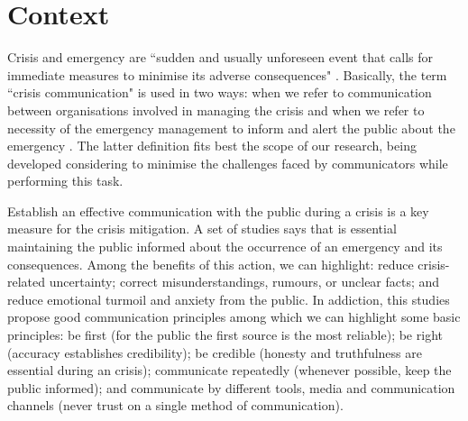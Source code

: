 \section{Context} 
%

Crisis and emergency are ``sudden and usually unforeseen event that calls for immediate measures to minimise its adverse consequences" \cite{dha1992internationally}. Basically, the term ``crisis communication" is used in two ways: when we refer to communication between organisations involved in managing the crisis and when we refer to necessity of the emergency management to inform and alert the public about the emergency \cite{cdc2014}. The latter definition fits best the scope of our research, being developed considering to minimise the challenges faced by communicators while performing this task. 

Establish an effective communication with the public during a crisis is a key measure for the crisis mitigation. A set of studies \cite{tinker2010}\cite{cdc2014}\cite{glik2007}\cite{seeger2006best} says that is essential maintaining the public informed about the occurrence of an emergency and its consequences. Among the benefits of this action, we can highlight: reduce crisis-related uncertainty; correct misunderstandings, rumours, or unclear facts; and reduce emotional turmoil and anxiety from the public. In addiction, this studies propose good communication principles among which we can highlight some basic principles: be first (for the public the first source is the most reliable); be right (accuracy establishes credibility); be credible (honesty and truthfulness are essential during an crisis); communicate repeatedly (whenever possible, keep the public informed); and communicate by different tools, media and communication channels (never trust on a single method of communication).



